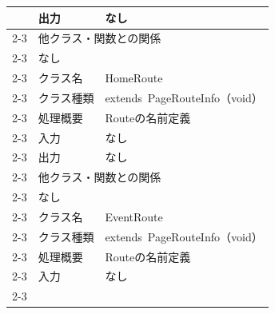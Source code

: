 \begin{longtable}{|c|l|l|}
                            & 出力                                                & なし                                            \\ \cline{2-3}
                            & \multicolumn{2}{l|}{他クラス・関数との関係}                                                                  \\ \cline{2-3}
                            & \multicolumn{2}{p{14cm}|}{なし}                                                                     \\ \cline{2-3}
                            & クラス名                                              & HomeRoute                                     \\ \cline{2-3}
                            & クラス種類                                             & extends\ PageRouteInfo（void）                  \\ \cline{2-3}
                            & 処理概要                                              & \multicolumn{1}{p{12cm}|}{Routeの名前定義}         \\ \cline{2-3}
                            & 入力                                                & なし                                            \\ \cline{2-3}
                            & 出力                                                & なし                                            \\ \cline{2-3}
                            & \multicolumn{2}{l|}{他クラス・関数との関係}                                                                  \\ \cline{2-3}
                            & \multicolumn{2}{p{14cm}|}{なし}                                                                     \\ \cline{2-3}
                            & クラス名                                              & EventRoute                                    \\ \cline{2-3}
                            & クラス種類                                             & extends\ PageRouteInfo（void）                  \\ \cline{2-3}
                            & 処理概要                                              & \multicolumn{1}{p{12cm}|}{Routeの名前定義}         \\ \cline{2-3}
                            & 入力                                                & なし                                            \\ \cline{2-3}

\end{longtable}
